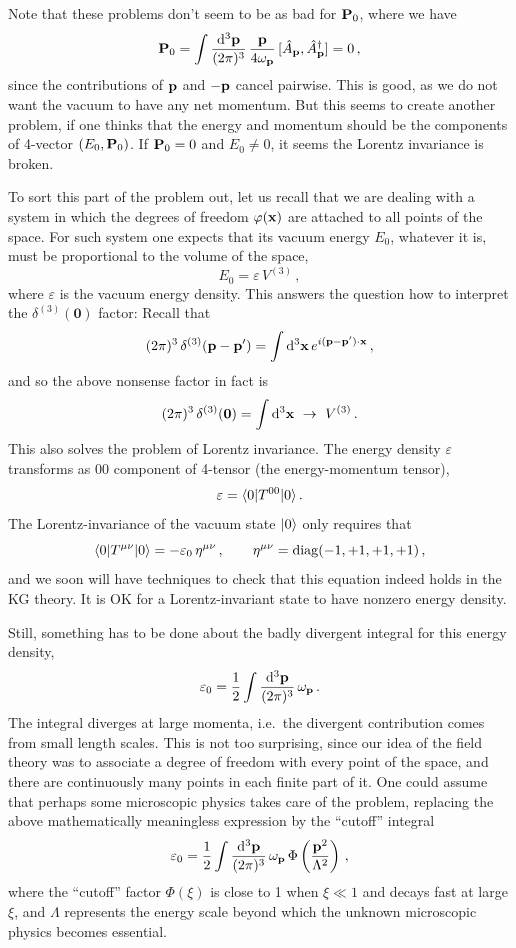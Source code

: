 Note that these problems don't seem to be as bad for $\mathbf{P}_0$, where we have
\[
\mathbf{P}_0=\int\frac{\mathop{}\!\mathrm{d}^3\mathbf{p}}{(2\pi)^3}\,\frac{\mathbf{p}}{4\omega_{\mathbf{p}}}\,[\hat A_{\mathbf{p}},\hat A^\dagger_{\mathbf{p}}]=0\,,
\]
since the contributions of $\mathbf{p}$ and $-\mathbf{p}$ cancel pairwise. This is good, as
we do not want the vacuum to have any net momentum. But this seems to create
another problem, if one thinks that the energy and momentum should be the
components of 4-vector $(E_0,\mathbf{P}_0)$. If $\mathbf{P}_0=0$ and $E_0\neq0$, it seems
the Lorentz invariance is broken.

To sort this part of the problem out, let us recall that we are dealing with
a system in which the degrees of freedom $\varphi(\mathbf{x})$ are attached to all
points of the space. For such system one expects that its vacuum energy
$E_0$, whatever it is, must be proportional to the volume of the space,
\[
E_0=\varepsilon\,V^{(3)}\,,
\]
where $\varepsilon$ is the vacuum energy density. This answers the question
how to interpret the $\delta^{(3)}(\mathbf 0)$ factor: Recall that
\[
(2\pi)^3\,\delta^{(3)}(\mathbf{p}-\mathbf{p}')=\int \mathop{}\!\mathrm{d}^3\mathbf{x}\,e^{i(\mathbf{p}-\mathbf{p}')\cdot\mathbf{x}}\,,
\]
and so the above nonsense factor in fact is
\[
(2\pi)^3\,\delta^{(3)}(\mathbf 0)=\int \dd^3\xx\ \to\ V^{(3)}\,.
\]
This also solves the problem of Lorentz invariance. The energy density
$\varepsilon$ transforms as $00$ component of 4-tensor (the energy-momentum
tensor),
\[
\varepsilon=\langle 0|T^{00}|0\rangle\,.
\]
The Lorentz-invariance of the vacuum state $|0\rangle$ only requires that
\[
\langle 0|T^{\mu\nu}|0\rangle=-\varepsilon_0\,\eta^{\mu\nu}\,,\qquad
\eta^{\mu\nu}=\operatorname{diag}(-1,+1,+1,+1)\,,
\]
and we soon will have techniques to check that this equation indeed holds in
the KG theory. It is OK for a Lorentz-invariant state to have nonzero energy
density.

Still, something has to be done about the badly divergent integral for this
energy density,
\[
\varepsilon_0=\frac12\int\frac{\mathop{}\!\mathrm{d}^3\mathbf{p}}{(2\pi)^3}\,\omega_{\mathbf{p}}\,.
\]
The integral diverges at large momenta, i.e.\ the divergent contribution comes
from small length scales. This is not too surprising, since our idea of the
field theory was to associate a degree of freedom with every point of the
space, and there are continuously many points in each finite part of it. One
could assume that perhaps some microscopic physics takes care of the problem,
replacing the above mathematically meaningless expression by the ``cutoff''
integral
\[
\varepsilon_0=\frac12\int\frac{\mathop{}\!\mathrm{d}^3\mathbf{p}}{(2\pi)^3}\,\omega_{\mathbf{p}}\,\Phi\left(\frac{\mathbf{p}^2}{\Lambda^2}\right)\,,
\]
where the ``cutoff'' factor $\Phi(\xi)$ is close to 1 when $\xi\ll1$ and
decays fast at large $\xi$, and $\Lambda$ represents the energy scale beyond
which the unknown microscopic physics becomes essential.

